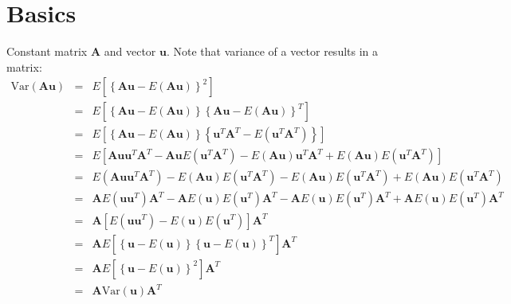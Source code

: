 \documentclass[11pt]{article}
\theoremstyle{remark}
\begin{document}
\section{Basics}
Constant matrix $\mathbf{A}$ and vector $\mathbf{u}$. Note that variance of a vector results in a matrix:
\begin{eqnarray}
\text{Var}(\mathbf{A}\mathbf{u}) &=& E\left[ \left\{  \mathbf{A}\mathbf{u}-E(\mathbf{A}\mathbf{u})  \right\}^2 \right]\nonumber\\
&=& E\left[ \left\{  \mathbf{A}\mathbf{u}-E(\mathbf{A}\mathbf{u})  \right\} \left\{ \mathbf{A}\mathbf{u}-E(\mathbf{A}\mathbf{u})  \right\}^T \right]\nonumber\\
&=& E\left[ \left\{  \mathbf{A}\mathbf{u}-E(\mathbf{A}\mathbf{u})  \right\} \left\{  \mathbf{u}^T\mathbf{A}^T-E(\mathbf{u}^T\mathbf{A}^T)  \right\} \right]\nonumber\\
&=& E\left[ \mathbf{A}\mathbf{u} \mathbf{u}^T\mathbf{A}^T - \mathbf{A}\mathbf{u} E(\mathbf{u}^T\mathbf{A}^T) -E(\mathbf{A}\mathbf{u})\mathbf{u}^T\mathbf{A}^T + E(\mathbf{A}\mathbf{u}) E(\mathbf{u}^T\mathbf{A}^T) \right]\nonumber\\
&=& E(\mathbf{A}\mathbf{u} \mathbf{u}^T\mathbf{A}^T) - E(\mathbf{A}\mathbf{u}) E(\mathbf{u}^T\mathbf{A}^T) -E(\mathbf{A}\mathbf{u})E(\mathbf{u}^T\mathbf{A}^T) + E(\mathbf{A}\mathbf{u}) E(\mathbf{u}^T\mathbf{A}^T)\nonumber\\
&=& \mathbf{A}E(\mathbf{u} \mathbf{u}^T)\mathbf{A}^T - \mathbf{A}E(\mathbf{u}) E(\mathbf{u}^T)\mathbf{A}^T - \mathbf{A}E(\mathbf{u})E(\mathbf{u}^T)\mathbf{A}^T + \mathbf{A}E(\mathbf{u}) E(\mathbf{u}^T)\mathbf{A}^T\nonumber\\
&=& \mathbf{A} \left[ E(\mathbf{u} \mathbf{u}^T) - E(\mathbf{u}) E(\mathbf{u}^T) \right]\mathbf{A}^T \nonumber\\
&=& \mathbf{A} E\left[ \left\{ \mathbf{u} - E(\mathbf{u}) \right\} \left\{ \mathbf{u} - E(\mathbf{u}) \right\}^T \right]\mathbf{A}^T \nonumber\\
&=& \mathbf{A} E\left[ \left\{ \mathbf{u} - E(\mathbf{u}) \right\}^2 \right]\mathbf{A}^T \nonumber\\
&=& \mathbf{A} \text{Var}(\mathbf{u}) \mathbf{A}^T
\label{VarianceProdConstantMatrix}
\end{eqnarray}

\clearpage
\end{document}
